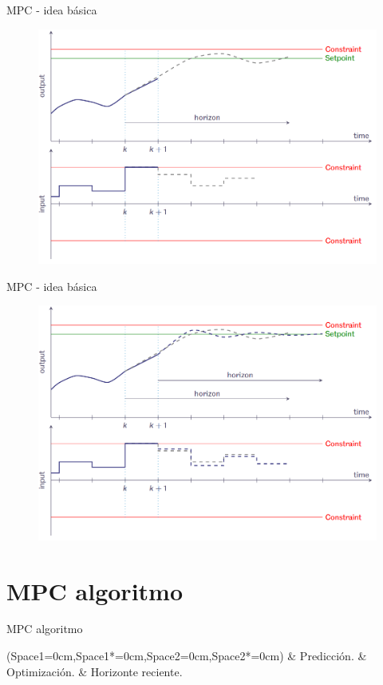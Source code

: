 \documentclass[8pt]{beamer}
\begin{document}
\begin{frame}[fragile]{MPC - idea básica}
	\begin{figure}[!ht]
		\centering
		\includegraphics[width=1\linewidth]{figures/MPC_basic_3}	
	\end{figure}
\end{frame}
\begin{frame}[fragile]{MPC - idea básica}
	\begin{figure}[!ht]
		\centering
		\includegraphics[width=1\linewidth]{figures/MPC_basic_4}	
	\end{figure}
\end{frame}

\section{MPC algoritmo}
\begin{frame}[fragile]{MPC algoritmo}
	\Activate
	\begin{easylist}[itemize] \ListProperties(Space1=0cm,Space1*=0cm,Space2=0cm,Space2*=0cm)
		& Predicción.
		& Optimización.
		& Horizonte reciente. 	
	\end{easylist}
	\Deactivate
\end{frame}
\end{document}
